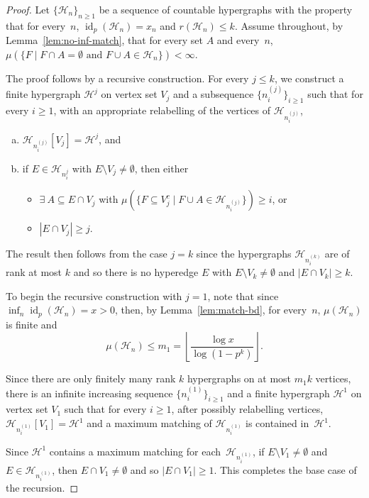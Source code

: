 \documentclass[11pt,reqno]{amsart}
\theoremstyle{definition}
\begin{document}
\begin{proof}
Let $\{\mathcal{H}_n\}_{n \geq 1}$ be a sequence of countable hypergraphs with the property that for every~$n$, ${\operatorname{id}}_p(\mathcal{H}_n) = x_n$ and $r(\mathcal{H}_n) \leq k$.  Assume throughout, by Lemma~\ref{lem:no-inf-match}, that for every set $A$ and every~$n$, $\mu(\{F \mid F \cap A = \emptyset \text{ and } F \cup A \in \mathcal{H}_n\}) < \infty$.

The proof follows by a recursive construction. For every $j \leq k$, we construct a finite hypergraph $\mathcal{H}^{j}$ on vertex set $V_j$ and a subsequence $\{n_i^{(j)}\}_{i \geq 1}$ such that for every $i \geq 1$, with an appropriate relabelling of the vertices of $\mathcal{H}_{n_i^{(j)}}$,
\begin{enumerate}[(a)]
	\item $\mathcal{H}_{n_i^{(j)}}[V_j] = \mathcal{H}^j$, and
	\item if $E \in \mathcal{H}_{n_i^j}$ with $E \setminus V_j \neq \emptyset$, then either
		\begin{itemize}
			\item $\exists\ A \subseteq E \cap V_j$ with $\mu(\{F \subseteq V_j^c \mid F\cup A \in \mathcal{H}_{n_i^{(j)}}\}) \geq i$, or
			\item $|E \cap V_j| \geq j$.
		\end{itemize}
\end{enumerate}
The result then follows from the case $j = k$ since the hypergraphs $\mathcal{H}_{n_i^{(k)}}$ are of rank at most $k$ and so there is no hyperedge $E$ with $E \setminus V_k \neq \emptyset$ and $|E \cap V_k| \geq k$.

To begin the recursive construction with $j = 1$, note that since $\inf_{n} {\operatorname{id}}_p(\mathcal{H}_n) = x > 0$, then, by Lemma~\ref{lem:match-bd}, for every~$n$, $\mu(\mathcal{H}_n)$ is finite and
\[
 \mu(\mathcal{H}_n) \leq m_1 = \left\lfloor \frac{\log x}{\log(1 - p^k)} \right\rfloor.
\]

Since there are only finitely many rank $k$ hypergraphs on at most $m_1 k$ vertices, there is an infinite increasing sequence $\{n_i^{(1)}\}_{i \geq 1}$ and a finite hypergraph $\mathcal{H}^1$ on vertex set $V_1$ such that for every $i \geq 1$, after possibly relabelling vertices, $\mathcal{H}_{n_i^{(1)}}[V_1] = \mathcal{H}^1$ and a maximum matching of $\mathcal{H}_{n_i^{(1)}}$ is contained in~$\mathcal{H}^1$.

Since $\mathcal{H}^1$ contains a maximum matching for each~$\mathcal{H}_{n_i^{(1)}}$, if $E \setminus V_1 \neq \emptyset$ and $E \in \mathcal{H}_{n_i^{(1)}}$, then $E \cap V_1 \neq \emptyset$ and so $|E \cap V_1 | \geq 1$. This completes the base case of the recursion.


\end{proof}
\end{document}
